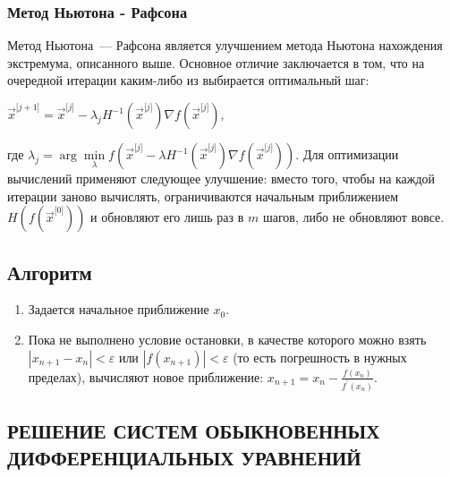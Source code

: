 \documentclass[a4paper]{article}
\begin{document}
{{{{{{{{\subsubsection{Метод Ньютона - Рафсона}
Метод Ньютона~--- Рафсона является улучшением метода Ньютона нахождения
экстремума, описанного выше. Основное отличие заключается в том, что на
очередной итерации каким-либо из выбирается оптимальный шаг:

{{\({\overset{\rightarrow}{x}}^{\lbrack j + 1\rbrack} = {\overset{\rightarrow}{x}}^{\lbrack j\rbrack} - \lambda_{j}H^{- 1}({\overset{\rightarrow}{x}}^{\lbrack j\rbrack})\nabla f({\overset{\rightarrow}{x}}^{\lbrack j\rbrack}),\)}}

где
{{\(\lambda_{j} = \arg\min\limits_{\lambda}f({\overset{\rightarrow}{x}}^{\lbrack j\rbrack} - \lambda H^{- 1}({\overset{\rightarrow}{x}}^{\lbrack j\rbrack})\nabla f({\overset{\rightarrow}{x}}^{\lbrack j\rbrack})).\)}}
Для оптимизации вычислений применяют следующее улучшение: вместо того,
чтобы на каждой итерации заново вычислять, ограничиваются начальным
приближением {{\(H(f({\overset{\rightarrow}{x}}^{\lbrack 0\rbrack}))\)}}
и обновляют его лишь раз в {{\(m\)}} шагов, либо не обновляют вовсе.

\subsection{Алгоритм}

\begin{enumerate}
    \item Задается начальное приближение {\(x_{0}\)}.
    \item Пока не выполнено условие остановки, в качестве которого можно взять {\(|x_{n + 1} - x_{n}| < \varepsilon\)} или {\(|f(x_{n + 1})| < \varepsilon\)} (то есть погрешность в нужных пределах), вычисляют новое приближение: {\(x_{n + 1} = x_{n} - \frac{f(x_{n})}{f^{\prime}(x_{n})}\)}.
\end{enumerate}

\newpage

\begin{center}
 \section{РЕШЕНИЕ СИСТЕМ ОБЫКНОВЕННЫХ ДИФФЕРЕНЦИАЛЬНЫХ УРАВНЕНИЙ}
\end{center}

}}}}}}}}
\end{document}

